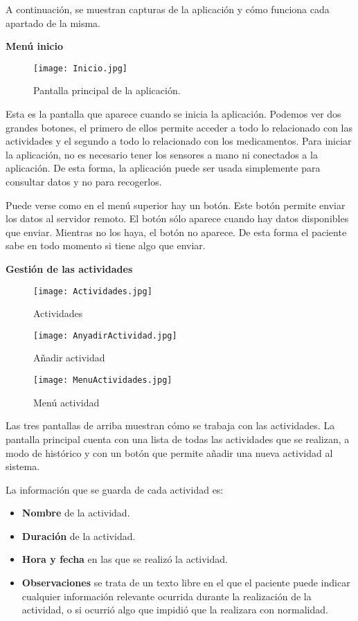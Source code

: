 \documentclass[11pt,spanish]{article}
\begin{document}
A continuación, se muestran capturas de la aplicación y cómo funciona cada apartado de la misma.
\newline

{\bf Menú inicio}
\begin{figure}[h!]
\centering
\texttt{[image: Inicio.jpg]}
\caption{Pantalla principal de la aplicación.}
\end{figure}
\newpage

Esta es la pantalla que aparece cuando se inicia la aplicación. Podemos ver dos grandes botones, el primero de ellos permite acceder a todo lo relacionado con las actividades y el segundo a todo lo relacionado con los medicamentos. Para iniciar la aplicación, no es necesario tener los sensores a mano ni conectados a la aplicación. De esta forma, la aplicación puede ser usada simplemente para consultar datos y no para recogerlos.
\newline

Puede verse como en el menú superior hay un botón. Este botón permite enviar los datos al servidor remoto. El botón sólo aparece cuando hay datos disponibles que enviar. Mientras no los haya, el botón no aparece. De esta forma el paciente sabe en todo momento si tiene algo que enviar.
\newline

{\bf Gestión de las actividades}
\newline
\begin{figure}[!htb]
  \texttt{[image: Actividades.jpg]}
  \caption{Actividades}
  \label{Actividades}
\endminipage\hfill
{}
  \texttt{[image: AnyadirActividad.jpg]}
  \caption{Añadir actividad}
  \label{Añadir actividad}
\endminipage\hfill
{}%
  \texttt{[image: MenuActividades.jpg]}
  \caption{Menú actividad}
  \label{Menú actividad}
\endminipage
\end{figure}

Las tres pantallas de arriba muestran cómo se trabaja con las actividades. La pantalla principal cuenta con una lista de todas las actividades que se realizan, a modo de histórico y con un botón que permite añadir una nueva actividad al sistema.
\newline

La información que se guarda de cada actividad es:

\begin{itemize}
	\item {\bf Nombre} de la actividad.
	\item {\bf Duración} de la actividad.
	\item {\bf Hora y fecha} en las que se realizó la actividad.
	\item {\bf Observaciones} se trata de un texto libre en el que el paciente puede indicar cualquier información relevante ocurrida durante la realización de la actividad, o si ocurrió algo que impidió que la realizara con normalidad.
\end{itemize}
\end{document}
